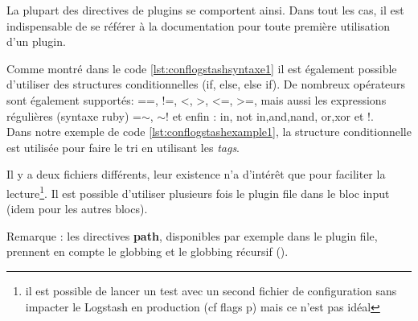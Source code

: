 La plupart des directives de plugins se comportent ainsi. Dans tout les cas, il
est indispensable de se référer à la documentation pour toute première utilisation d'un
plugin.


Comme montré dans le code \ref{lst:conflogstashsyntaxe1} il est également possible 
d'utiliser des structures conditionnelles (if, else, else if).
De nombreux opérateurs sont également supportés: ==, !=, <, >, <=, >=, mais aussi
les expressions régulières (syntaxe ruby) =$\sim$, $\sim$! et enfin : in, not in,and,nand,
or,xor et !.\\[4mm]
Dans notre exemple de code \ref{lst:conflogstashexample1}, la structure conditionnelle
est utilisée pour faire le tri en utilisant les \emph{tags}.


Il y a deux fichiers différents, leur existence n'a d'intérêt que pour faciliter la
lecture\footnote{il est possible de lancer un test avec un second fichier de configuration
sans impacter le Logstash en production (cf flags p\pageref{subsec:logstashflag}) 
mais ce n'est pas idéal}. Il est possible d'utiliser plusieurs fois le plugin file 
dans le bloc input (idem pour les autres blocs).

Remarque : les directives \textbf{path}, disponibles par exemple dans
le plugin file, prennent en compte le globbing et le globbing récursif 
().


